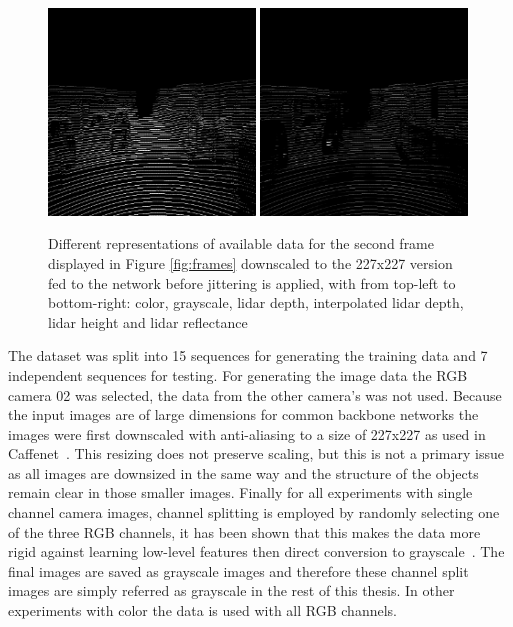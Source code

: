 \begin{figure}
\includegraphics[width=0.49\textwidth]{images/lidar_height.png}
\includegraphics[width=0.49\textwidth]{images/lidar_refl.png}
\caption{Different representations of available data for the second frame displayed in Figure \ref{fig:frames} downscaled to the 227x227 version fed to the network before jittering is applied, with from top-left to bottom-right: color, grayscale, lidar depth, interpolated lidar depth, lidar height and lidar reflectance}
\label{fig:features}
\end{figure}

The dataset was split into 15 sequences for generating the training data and 7 independent sequences for testing. For generating the image data the RGB camera 02 was selected, the data from the other camera's was not used. Because the input images are of large dimensions for common backbone networks the images were first downscaled with anti-aliasing to a size of 227x227 as used in Caffenet~\cite{jia2014}. This resizing does not preserve scaling, but this is not a primary issue as all images are downsized in the same way and the structure of the objects remain clear in those smaller images. Finally for all experiments with single channel camera images, channel splitting is employed by randomly selecting one of the three RGB channels, it has been shown that this makes the data more rigid against learning low-level features then direct conversion to grayscale~\cite{lee2017}. The final images are saved as grayscale images and therefore these channel split images are simply referred as grayscale in the rest of this thesis. In other experiments with color the data is used with all RGB channels.

